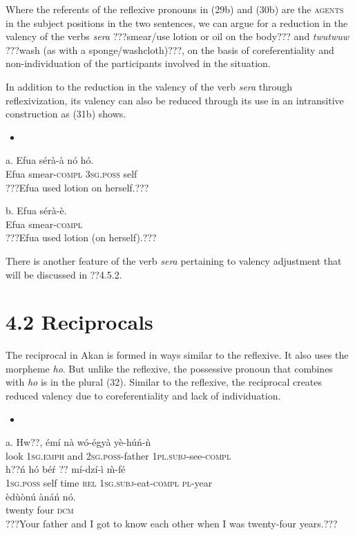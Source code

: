 \documentclass[output=paper]{langsci/langscibook}
\begin{document}
Where the referents of the reflexive pronouns in (29b) and (30b) are the \textsc{agents} in the subject positions in the two sentences, we can argue for a reduction in the valency of the verbs \emph{sera} ???smear/use lotion or oil on the body??? and \emph{twutwuw} ???wash (as with a sponge/washcloth)???, on the basis of coreferentiality and non-individuation of the participants involved in the situation. 

In addition to the reduction in the valency of the verb \emph{sera} through reflexivization, its valency can also be reduced through its use in an intransitive construction as (31b) shows.

\begin{itemize}
\item \end{itemize}
\gll a.  Efua  s\'{e}r\`{a}-\`{a}    n\'{o}    h\'{o}.\\
       Efua  smear-\textsc{compl}  \textsc{3sg.poss}  self\\
\glt   ???Efua used lotion on herself.???
\z

\gll  b.  Efua  s\'{e}r\`{a}-\`{e}.\\
       Efua  smear-\textsc{compl}\\
\glt   ???Efua used lotion (on herself).???
\z

There is another feature of the verb \emph{sera} pertaining to valency adjustment that will be discussed in ??4.5.2.

\section{4.2  Reciprocals}

The reciprocal in Akan is formed in ways similar to the reflexive. It also uses the morpheme \emph{ho}. But unlike the reflexive, the possessive pronoun that combines with \emph{ho} is in the plural (32). Similar to the reflexive, the reciprocal creates reduced valency due to coreferentiality and lack of individuation.

\begin{itemize}
\item \end{itemize}
\gll a.  Hw??,  \'{e}m\'{i}     n\`{a}   w\'{o}-\'{e}gy\`{a}     y\`{e}-h\'{u}\'{n}-\`{n}       \\
       look  \textsc{1sg.emph}  and  \textsc{2sg.poss}{}-father  \textsc{1pl.subj}{}-see-\textsc{compl}  \\
\gll   h??\'{n}    h\'{o}   b\'{e}\'{r}   ??  m\'{i}-dz\'{i}-\`{i}     \`{m}-f\'{e}  \\
       \textsc{1sg.poss}  self  time  \textsc{rel}  \textsc{1sg.subj}{}-eat-\textsc{compl}  \textsc{pl}{}-year\\
\gll   \`{e}d\`{u}\`{o}n\'{u}   \`{a}n\'{a}\'{n}     n\'{o}.     \\
       twenty    four    \textsc{dcm}\\
\glt ???Your father and I got to know each other when I was twenty-four years.??? \citep[9]{Martin1936}
\z
\end{document}
